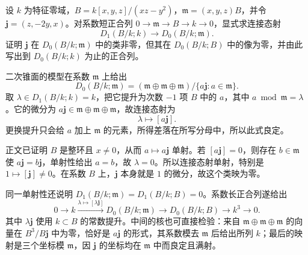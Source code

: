 \begin{exercise}\label{b3:ex:C-aq-coefficient-connecting}
	设 \(k\) 为特征零域，\(B=k[x,y,z]/(xz-y^2)\)，\(\mathfrak m=(x,y,z)B\)，并令 \(\mathbf j=(z,-2y,x)\)。对系数短正合列 \(0\to\mathfrak m\to B\to k\to0\)，显式求连接态射
	\[
		D_1(B/k;k)\longrightarrow D_0(B/k;\mathfrak m).
	\]
	证明 \(\mathbf j\) 在 \(D_0(B/k;\mathfrak m)\) 中的类非零，但其在 \(D_0(B/k;B)\) 中的像为零，并由此写出到 \(D_0(B/k;k)\) 为止的正合列。
\end{exercise}
\begin{solution}
	二次锥面的模型在系数 \(\mathfrak m\) 上给出
	\[
		D_0(B/k;\mathfrak m)=(\mathfrak m\oplus\mathfrak m\oplus\mathfrak m)/\{a\mathbf j:a\in\mathfrak m\}.
	\]
	取 \(\lambda\in D_1(B/k;k)=k\)，把它提升为次数 \(-1\) 项 \(B\) 中的 \(a\)，其中 \(a\bmod\mathfrak m=\lambda\)。它的微分为 \(a\mathbf j\in\mathfrak m\oplus\mathfrak m\oplus\mathfrak m\)，故连接态射为
	\[
		\lambda\longmapsto[a\mathbf j].
	\]
	更换提升只会给 \(a\) 加上 \(\mathfrak m\) 的元素，所得差落在所写分母中，所以此式良定。

	正文已证明 \(B\) 是整环且 \(x\ne0\)，从而 \(a\mapsto a\mathbf j\) 单射。若 \([a\mathbf j]=0\)，则存在 \(b\in\mathfrak m\) 使 \(a\mathbf j=b\mathbf j\)，单射性给出 \(a=b\)，故 \(\lambda=0\)。所以连接态射单射，特别是 \(1\mapsto[\mathbf j]\ne0\)。在系数 \(B\) 上，\(\mathbf j\) 本身就是 \(1\) 的微分，故这个类映为零。

	同一单射性还说明 \(D_1(B/k;\mathfrak m)=D_1(B/k;B)=0\)。系数长正合列遂给出
	\[
		0\longrightarrow k\xrightarrow{\lambda\mapsto[\lambda\mathbf j]}
		D_0(B/k;\mathfrak m)\longrightarrow D_0(B/k;B)\longrightarrow k^3\longrightarrow0.
	\]
	其中 \(\lambda\mathbf j\) 使用 \(k\subset B\) 的常数提升。中间的核也可直接检验：来自 \(\mathfrak m\oplus\mathfrak m\oplus\mathfrak m\) 的向量在 \(B^3/B\mathbf j\) 中为零，恰好是 \(a\mathbf j\) 的形式，其系数模去 \(\mathfrak m\) 后给出所列 \(k\)；最后的映射是三个坐标模 \(\mathfrak m\)，因 \(\mathbf j\) 的坐标均在 \(\mathfrak m\) 中而良定且满射。
\end{solution}
